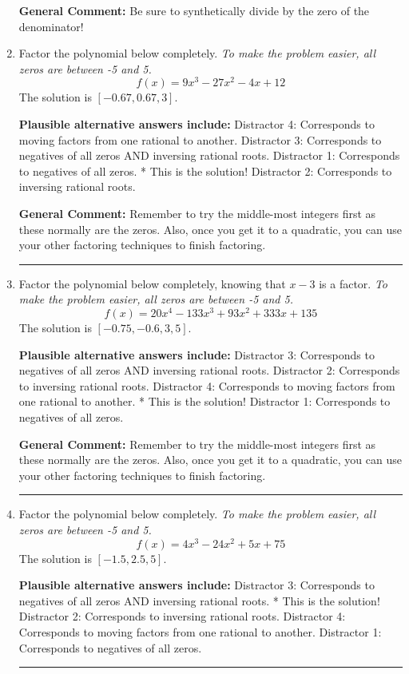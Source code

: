 \documentclass{extbook}[14pt]
\newcommand{\litem}[1]{\item #1

\rule{\textwidth}{0.4pt}}
\begin{document}
\begin{enumerate}
{\textbf{General Comment:} Be sure to synthetically divide by the zero of the denominator!
}
\litem{
Factor the polynomial below completely. \textit{To make the problem easier, all zeros are between -5 and 5.}
\[ f(x) = 9x^{3} -27 x^{2} -4 x + 12 \]The solution is \( [-0.67, 0.67, 3] \).\begin{enumerate}[label=\Alph*.]
\textbf{Plausible alternative answers include:} Distractor 4: Corresponds to moving factors from one rational to another.
 Distractor 3: Corresponds to negatives of all zeros AND inversing rational roots.
 Distractor 1: Corresponds to negatives of all zeros.
* This is the solution!
 Distractor 2: Corresponds to inversing rational roots.
\end{enumerate}

\textbf{General Comment:} Remember to try the middle-most integers first as these normally are the zeros. Also, once you get it to a quadratic, you can use your other factoring techniques to finish factoring.
}
\litem{
Factor the polynomial below completely, knowing that $x -3$ is a factor. \textit{To make the problem easier, all zeros are between -5 and 5.}
\[ f(x) = 20x^{4} -133 x^{3} +93 x^{2} +333 x + 135 \]The solution is \( [-0.75, -0.6, 3, 5] \).\begin{enumerate}[label=\Alph*.]
\textbf{Plausible alternative answers include:} Distractor 3: Corresponds to negatives of all zeros AND inversing rational roots.
 Distractor 2: Corresponds to inversing rational roots.
 Distractor 4: Corresponds to moving factors from one rational to another.
* This is the solution!
 Distractor 1: Corresponds to negatives of all zeros.
\end{enumerate}

\textbf{General Comment:} Remember to try the middle-most integers first as these normally are the zeros. Also, once you get it to a quadratic, you can use your other factoring techniques to finish factoring.
}
\litem{
Factor the polynomial below completely. \textit{To make the problem easier, all zeros are between -5 and 5.}
\[ f(x) = 4x^{3} -24 x^{2} +5 x + 75 \]The solution is \( [-1.5, 2.5, 5] \).\begin{enumerate}[label=\Alph*.]
\textbf{Plausible alternative answers include:} Distractor 3: Corresponds to negatives of all zeros AND inversing rational roots.
* This is the solution!
 Distractor 2: Corresponds to inversing rational roots.
 Distractor 4: Corresponds to moving factors from one rational to another.
 Distractor 1: Corresponds to negatives of all zeros.
\end{enumerate}

}
\end{enumerate}
\end{document}
